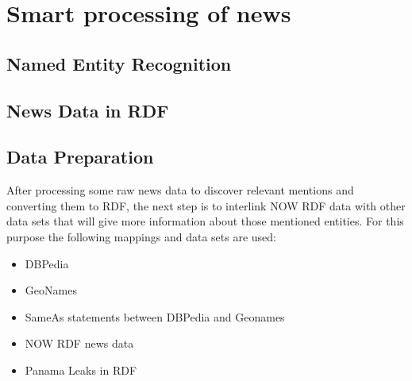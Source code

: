 \chapter{Smart processing of news}
\section{Named Entity Recognition}
\section{News Data in RDF}
\section{Data Preparation}
After processing some raw news data to discover relevant mentions and converting them to RDF, the next step is to interlink NOW RDF data with other data sets that will give more information about those mentioned entities. For this purpose the following mappings and data sets are used:
\begin{itemize}
    \item DBPedia
    \item GeoNames
    \item SameAs statements between DBPedia and Geonames
    \item NOW RDF news data
    \item Panama Leaks in RDF
\end{itemize}

